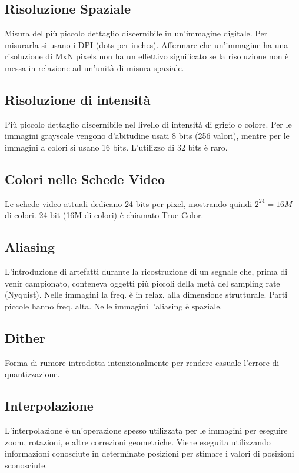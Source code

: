 \documentclass[8pt,a4paper]{article}
\begin{document}
\begin{multicols}{5}
    \subsection{Risoluzione Spaziale}
    Misura del più piccolo dettaglio discernibile in un'immagine digitale.
    Per misurarla si usano i DPI (dots per inches). Affermare che un'immagine ha una
    risoluzione di MxN pixels non ha un effettivo significato se la risoluzione non è 
    messa in relazione ad un'unità di misura spaziale.

    \subsection{Risoluzione di intensità}
    Più piccolo dettaglio discernibile nel livello di intensità di grigio o colore.
    Per le immagini grayscale vengono d'abitudine usati 8 bits (256 valori), mentre
    per le immagini a colori si usano 16 bits. L'utilizzo di 32 bits è raro.

    \subsection{Colori nelle Schede Video}
    Le schede video attuali dedicano 24 bits per pixel, mostrando quindi $2^{24} = 16M$
    di colori. 24 bit (16M di colori) è chiamato True Color.

    \subsection{Aliasing}
    L'introduzione di artefatti durante la ricostruzione di un segnale
    che, prima di venir campionato, conteneva oggetti più piccoli della metà
    del sampling rate (Nyquist). Nelle immagini la freq. è in relaz. alla dimensione
    strutturale. Parti piccole hanno freq. alta. Nelle immagini l'aliasing è spaziale.

    \subsection{Dither}
    Forma di rumore introdotta intenzionalmente per rendere casuale l'errore di
    quantizzazione.
    
    \subsection{Interpolazione}
    L’interpolazione è un'operazione spesso utilizzata per le immagini per eseguire 
    zoom, rotazioni, e altre correzioni geometriche. Viene eseguita utilizzando 
    informazioni conosciute in determinate posizioni per stimare i valori di 
    posizioni sconosciute.
    

\end{multicols}
\end{document}
